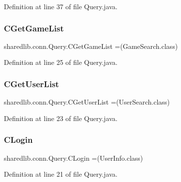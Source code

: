 Definition at line 37 of file Query.\+java.

\hypertarget{enumsharedlib_1_1conn_1_1_query_ae1f5629ed4a2fa6edbe873b3d34f2c70}{}\label{enumsharedlib_1_1conn_1_1_query_ae1f5629ed4a2fa6edbe873b3d34f2c70} 
\subsubsection{\texorpdfstring{C\+Get\+Game\+List}{CGetGameList}}
{\footnotesize\ttfamily sharedlib.\+conn.\+Query.\+C\+Get\+Game\+List =(Game\+Search.\+class)}



Definition at line 25 of file Query.\+java.

\hypertarget{enumsharedlib_1_1conn_1_1_query_ae5ad3e5d72c454bea8933cc09c8a6a59}{}\label{enumsharedlib_1_1conn_1_1_query_ae5ad3e5d72c454bea8933cc09c8a6a59} 
\subsubsection{\texorpdfstring{C\+Get\+User\+List}{CGetUserList}}
{\footnotesize\ttfamily sharedlib.\+conn.\+Query.\+C\+Get\+User\+List =(User\+Search.\+class)}



Definition at line 23 of file Query.\+java.

\hypertarget{enumsharedlib_1_1conn_1_1_query_aea56634d75f246edb84fc81d18c7c713}{}\label{enumsharedlib_1_1conn_1_1_query_aea56634d75f246edb84fc81d18c7c713} 
\subsubsection{\texorpdfstring{C\+Login}{CLogin}}
{\footnotesize\ttfamily sharedlib.\+conn.\+Query.\+C\+Login =(User\+Info.\+class)}



Definition at line 21 of file Query.\+java.

